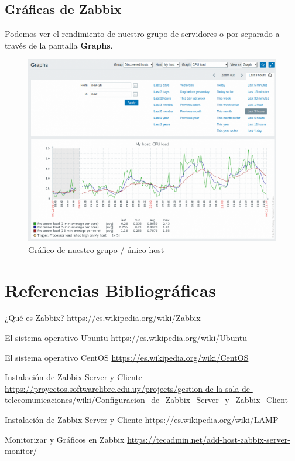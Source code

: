 \documentclass[12pt,a4paper]{article}
\begin{document}
	\subsection{Gráficas de Zabbix}
		Podemos ver el rendimiento de nuestro grupo de servidores o por separado a través de la pantalla \textbf{Graphs}.
		\newline
		\begin{figure}[h]
			\centering
			\includegraphics[width=1.0\textwidth]{images/graphs.png}
			\caption{Gráfico de nuestro grupo / único host}
		\end{figure}
	
	
	\newpage
	\section{Referencias Bibliográficas}
	\begin{thebibliography}{9}
		¿Qué es Zabbix?
		\url{https://es.wikipedia.org/wiki/Zabbix}
		
		El sistema operativo Ubuntu
		\url{https://es.wikipedia.org/wiki/Ubuntu}
		
		El sistema operativo CentOS
		\url{https://es.wikipedia.org/wiki/CentOS}
		
		Instalación de Zabbix Server y Cliente
		\url{https://proyectos.softwarelibre.edu.uy/projects/gestion-de-la-sala-de-telecomunicaciones/wiki/Configuracion_de_Zabbix_Server_y_Zabbix_Client}
		
		Instalación de Zabbix Server y Cliente
		\url{https://es.wikipedia.org/wiki/LAMP}
		
		
		Monitorizar y Gráficos en Zabbix
		\url{https://tecadmin.net/add-host-zabbix-server-monitor/}
		
		
	\end{thebibliography}
		
\end{document}
